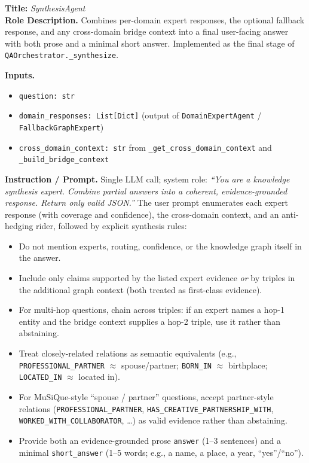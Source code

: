 \documentclass{article}
\begin{document}
\begin{agentbox}
\textbf{Title:} \textit{SynthesisAgent}\\
\textbf{Role Description.} Combines per-domain expert responses, the
optional fallback response, and any cross-domain bridge context into a
final user-facing answer with both prose and a minimal short answer.
Implemented as the final stage of \texttt{QAOrchestrator.\_synthesize}.

\textbf{Inputs.}
\begin{itemize}[leftmargin=*,nosep]
\item \texttt{question: str}
\item \texttt{domain\_responses: List[Dict]} (output of \texttt{DomainExpertAgent} / \texttt{FallbackGraphExpert})
\item \texttt{cross\_domain\_context: str} from \texttt{\_get\_cross\_domain\_context} and \texttt{\_build\_bridge\_context}
\end{itemize}

\textbf{Instruction / Prompt.} Single LLM call; system role: \textit{``You are a knowledge synthesis expert. Combine partial answers into a coherent, evidence-grounded response. Return only valid JSON.''} The user prompt enumerates each expert response (with coverage and confidence), the cross-domain context, and an anti-hedging rider, followed by explicit synthesis rules:
\begin{itemize}[leftmargin=*,nosep]
\item Do not mention experts, routing, confidence, or the knowledge graph itself in the answer.
\item Include only claims supported by the listed expert evidence \emph{or} by triples in the additional graph context (both treated as first-class evidence).
\item For multi-hop questions, chain across triples: if an expert names a hop-1 entity and the bridge context supplies a hop-2 triple, use it rather than abstaining.
\item Treat closely-related relations as semantic equivalents (e.g., \texttt{PROFESSIONAL\_PARTNER} $\approx$ spouse/partner; \texttt{BORN\_IN} $\approx$ birthplace; \texttt{LOCATED\_IN} $\approx$ located in).
\item For MuSiQue-style ``spouse / partner'' questions, accept partner-style relations (\texttt{PROFESSIONAL\_PARTNER}, \texttt{HAS\_CREATIVE\_PARTNERSHIP\_WITH}, \texttt{WORKED\_WITH\_COLLABORATOR}, \ldots) as valid evidence rather than abstaining.
\item Provide both an evidence-grounded prose \texttt{answer} (1--3 sentences) and a minimal \texttt{short\_answer} (1--5 words; e.g., a name, a place, a year, ``yes''/``no'').
\end{itemize}


\end{agentbox}
\end{document}
